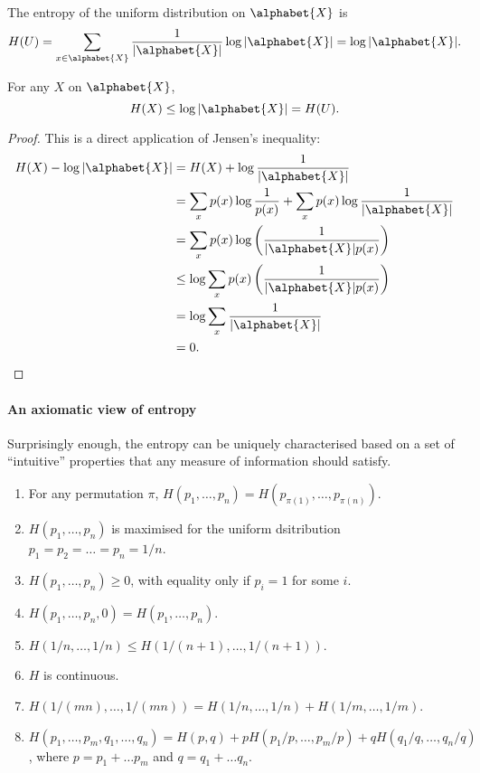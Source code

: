 \documentclass[a4paper, 11pt, openany]{book}
\begin{document}
The entropy of the uniform distribution on $\alphabet{X}$ is
\[
	H(U) = \sum_{x \in \alphabet{X}} \frac{1}{|\alphabet{X}|} \log |\alphabet{X}| =  \log |\alphabet{X}|.
\]

\begin{theorem}
For any $X$ on $\alphabet{X}$,
\[
	H(X) \le  \log |\alphabet{X}| = H(U).
\]
\end{theorem}

\begin{proof}
This is a direct application of Jensen's inequality:
\begin{align*}
    H(X) - \log|\alphabet{X}| &= H(X) + \log \frac{1}{|\alphabet{X}|}\\
    &= \sum_x p(x) \log \frac{1}{p(x)} + \sum_x p(x) \log \frac{1}{|\alphabet{X}|}\\
    &= \sum_x p(x) \log \left( \frac{1} {|\alphabet{X}| p(x)} \right)\\
    &\le \log \sum_x p(x) \left( \frac{1} {|\alphabet{X}| p(x)} \right)\\
    &= \log \sum_x \frac{1}{|\alphabet{X}|}\\
    &= 0.
\end{align*}
\end{proof}

\paragraph{An axiomatic view of entropy}

Surprisingly enough, the entropy can be uniquely characterised based on a set of ``intuitive'' properties that any measure of information should satisfy.
\begin{enumerate}
    \item For any permutation $\pi$, $H(p_1, \dots, p_n) = H(p_{\pi(1)}, \dots, p_{\pi(n)})$.

    \item $H(p_1, \dots, p_n)$ is maximised for the uniform dsitribution $p_1 = p_2 = \dots = p_n = 1/n$.

    \item $H(p_1, \dots, p_n) \ge 0$, with equality only if $p_i = 1$ for some $i$.

    \item $H(p_1, \dots, p_n, 0) = H(p_1, \dots, p_n)$.

    \item $H(1/n, \dots, 1/n) \le H(1/(n+1), \dots, 1/(n+1))$.

    \item $H$ is continuous.

    \item $H(1/(mn), \dots, 1/(mn)) = H(1/n, \dots, 1/n) + H(1/m, \dots, 1/m)$.

    \item $H(p_1, \dots, p_m, q_1, \dots, q_n) = H(p,q) + p H(p_1/p, \dots, p_m/p) + q H( q_1/q, \dots, q_n/q )$, where $p = p_1 + \dots p_m$ and $q = q_1 + \dots q_n$.
\end{enumerate}
\end{document}
